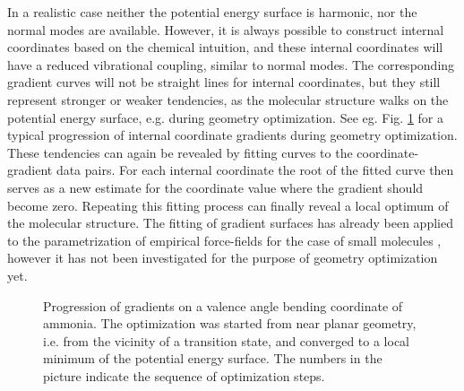 \documentclass[prl,aps,twocolumn,showpacs,twocolumngrid,superbib]{revtex4}
\begin{document}
In a realistic case neither the potential energy surface is 
harmonic, nor the normal modes are available. However, it is always
possible to construct internal coordinates based on the chemical
intuition, and these internal coordinates will have a reduced
vibrational coupling, similar to normal modes. The corresponding
gradient curves will not be straight lines for internal coordinates,
but they still represent stronger or weaker tendencies, as the molecular
structure walks on the potential energy surface, e.g. during geometry
optimization.
See eg. Fig. \ref{NH3outp6} for a typical progression of internal
coordinate gradients during geometry optimization.
These tendencies can again be revealed by fitting curves to the
coordinate-gradient data pairs. For each internal coordinate 
the root of the fitted curve then 
serves as a new estimate for the coordinate value where the gradient
should become zero. Repeating this fitting process can finally
reveal a local optimum of the molecular structure.
The fitting of gradient surfaces has already been applied to 
the parametrization of empirical
force-fields for the case of small molecules
\cite{force-field-fitting}, however it 
has not been investigated for the purpose of geometry optimization yet.
\begin{figure}[h]
\caption{
\small  
Progression of gradients on a valence angle bending coordinate of
ammonia. The optimization was started from near planar geometry, i.e.
from the vicinity of a transition state, and converged to a local 
minimum of the potential energy surface. The numbers in the picture
indicate the sequence of optimization steps.
\label{NH3outp6}
}
\end{figure}
\end{document}
